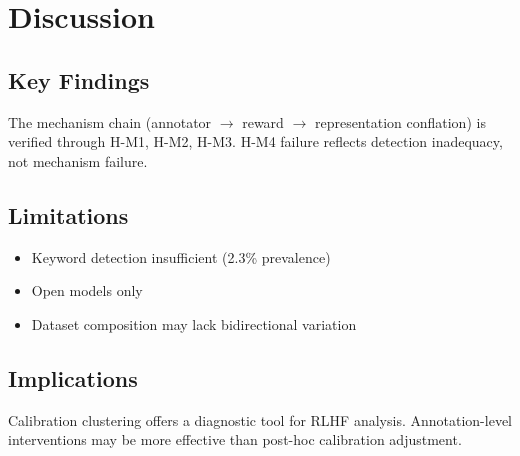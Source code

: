 \section{Discussion}

\subsection{Key Findings}

The mechanism chain (annotator $\rightarrow$ reward $\rightarrow$ representation conflation) is verified through H-M1, H-M2, H-M3. H-M4 failure reflects detection inadequacy, not mechanism failure.

\subsection{Limitations}

\begin{itemize}
    \item Keyword detection insufficient (2.3\% prevalence)
    \item Open models only
    \item Dataset composition may lack bidirectional variation
\end{itemize}

\subsection{Implications}

Calibration clustering offers a diagnostic tool for RLHF analysis. Annotation-level interventions may be more effective than post-hoc calibration adjustment.

